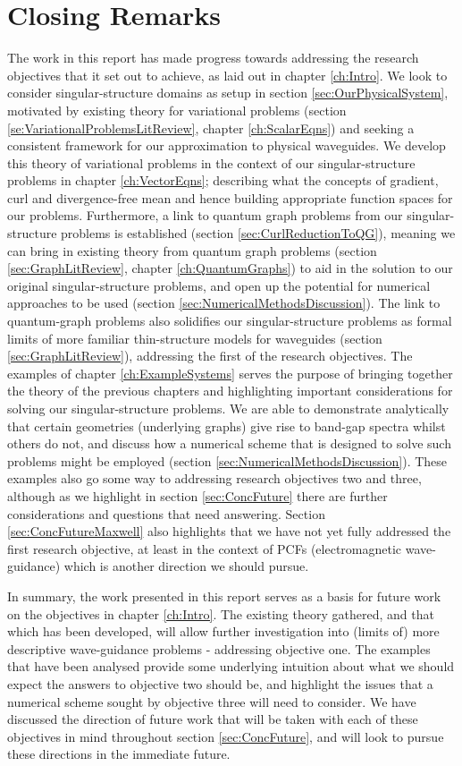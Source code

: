 \section{Closing Remarks} \label{sec:ConcClosingRemarks}
The work in this report has made progress towards addressing the research objectives that it set out to achieve, as laid out in chapter \ref{ch:Intro}.
We look to consider singular-structure domains as setup in section \ref{sec:OurPhysicalSystem}, motivated by existing theory for variational problems (section \ref{se:VariationalProblemsLitReview}, chapter \ref{ch:ScalarEqns}) and seeking a consistent framework for our approximation to physical waveguides.
We develop this theory of variational problems in the context of our singular-structure problems in chapter \ref{ch:VectorEqns}; describing what the concepts of gradient, curl and divergence-free mean and hence building appropriate function spaces for our problems.
Furthermore, a link to quantum graph problems from our singular-structure problems is established (section \ref{sec:CurlReductionToQG}), meaning we can bring in existing theory from quantum graph problems (section \ref{sec:GraphLitReview}, chapter \ref{ch:QuantumGraphs}) to aid in the solution to our original singular-structure problems, and open up the potential for numerical approaches to be used (section \ref{sec:NumericalMethodsDiscussion}).
The link to quantum-graph problems also solidifies our singular-structure problems as formal limits of more familiar thin-structure models for waveguides (section \ref{sec:GraphLitReview}), addressing the first of the research objectives.
The examples of chapter \ref{ch:ExampleSystems} serves the purpose of bringing together the theory of the previous chapters and highlighting important considerations for solving our singular-structure problems.
We are able to demonstrate analytically that certain geometries (underlying graphs) give rise to band-gap spectra whilst others do not, and discuss how a numerical scheme that is designed to solve such problems might be employed (section \ref{sec:NumericalMethodsDiscussion}).
These examples also go some way to addressing research objectives two and three, although as we highlight in section \ref{sec:ConcFuture} there are further considerations and questions that need answering.
Section \ref{sec:ConcFutureMaxwell} also highlights that we have not yet fully addressed the first research objective, at least in the context of PCFs (electromagnetic wave-guidance) which is another direction we should pursue. \newline

In summary, the work presented in this report serves as a basis for future work on the objectives in chapter \ref{ch:Intro}.
The existing theory gathered, and that which has been developed, will allow further investigation into (limits of) more descriptive wave-guidance problems - addressing objective one.
The examples that have been analysed provide some underlying intuition about what we should expect the answers to objective two should be, and highlight the issues that a numerical scheme sought by objective three will need to consider.
We have discussed the direction of future work that will be taken with each of these objectives in mind throughout section \ref{sec:ConcFuture}, and will look to pursue these directions in the immediate future.